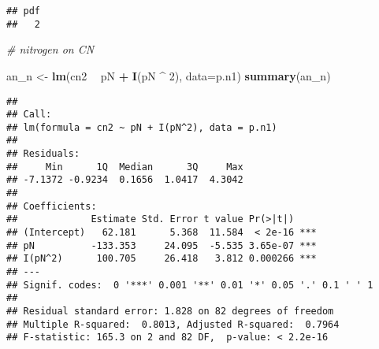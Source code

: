 \documentclass[]{article}
\newenvironment{Shaded}{\begin{snugshade}}{\end{snugshade}}
\newcommand{\KeywordTok}[1]{\textcolor[rgb]{0.13,0.29,0.53}{\textbf{#1}}}
\newcommand{\DataTypeTok}[1]{\textcolor[rgb]{0.13,0.29,0.53}{#1}}
\newcommand{\DecValTok}[1]{\textcolor[rgb]{0.00,0.00,0.81}{#1}}
\newcommand{\StringTok}[1]{\textcolor[rgb]{0.31,0.60,0.02}{#1}}
\newcommand{\CommentTok}[1]{\textcolor[rgb]{0.56,0.35,0.01}{\textit{#1}}}
\newcommand{\OperatorTok}[1]{\textcolor[rgb]{0.81,0.36,0.00}{\textbf{#1}}}
\newcommand{\NormalTok}[1]{#1}
\begin{document}
\begin{verbatim}
## pdf 
##   2
\end{verbatim}

\begin{Shaded}
\begin{Highlighting}[]
\CommentTok{# nitrogen on CN}

\NormalTok{an_n <-}\StringTok{ }\KeywordTok{lm}\NormalTok{(cn2 }\OperatorTok{~}\StringTok{ }\NormalTok{pN }\OperatorTok{+}\StringTok{ }\KeywordTok{I}\NormalTok{(pN }\OperatorTok{^}\StringTok{ }\DecValTok{2}\NormalTok{), }\DataTypeTok{data=}\NormalTok{p.n1)}
\KeywordTok{summary}\NormalTok{(an_n)}
\end{Highlighting}
\end{Shaded}

\begin{verbatim}
## 
## Call:
## lm(formula = cn2 ~ pN + I(pN^2), data = p.n1)
## 
## Residuals:
##     Min      1Q  Median      3Q     Max 
## -7.1372 -0.9234  0.1656  1.0417  4.3042 
## 
## Coefficients:
##             Estimate Std. Error t value Pr(>|t|)    
## (Intercept)   62.181      5.368  11.584  < 2e-16 ***
## pN          -133.353     24.095  -5.535 3.65e-07 ***
## I(pN^2)      100.705     26.418   3.812 0.000266 ***
## ---
## Signif. codes:  0 '***' 0.001 '**' 0.01 '*' 0.05 '.' 0.1 ' ' 1
## 
## Residual standard error: 1.828 on 82 degrees of freedom
## Multiple R-squared:  0.8013, Adjusted R-squared:  0.7964 
## F-statistic: 165.3 on 2 and 82 DF,  p-value: < 2.2e-16
\end{verbatim}
\end{document}
